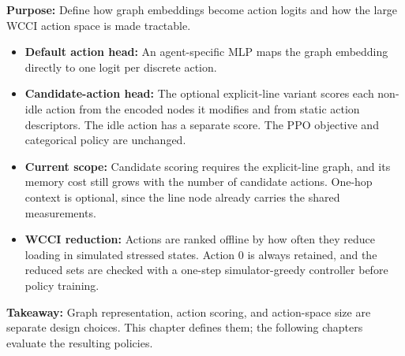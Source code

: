 \begin{tcolorbox}[
  colframe=red!75!black,
  colback=red!5!white,
  title=Chapter Summary (3/3): Action Scoring and Large-Grid Reduction
]
\textbf{Purpose:} Define how graph embeddings become action logits and how the
large WCCI action space is made tractable.

\begin{itemize}
  \item \textbf{Default action head:} An agent-specific MLP maps the graph
  embedding directly to one logit per discrete action.
  \item \textbf{Candidate-action head:} The optional explicit-line variant
  scores each non-idle action from the encoded nodes it modifies and from static
  action descriptors. The idle action has a separate score. The PPO objective
  and categorical policy are unchanged.
  \item \textbf{Current scope:} Candidate scoring requires the explicit-line
  graph, and its memory cost still grows with the number of candidate actions.
  One-hop context is optional, since the line node already carries the shared
  measurements.
  \item \textbf{WCCI reduction:} Actions are ranked offline by how often they
  reduce loading in simulated stressed states. Action 0 is always retained, and
  the reduced sets are checked with a one-step simulator-greedy controller
  before policy training.
\end{itemize}

\textbf{Takeaway:} Graph representation, action scoring, and action-space size
are separate design choices. This chapter defines them; the following chapters
evaluate the resulting policies.
\end{tcolorbox}
